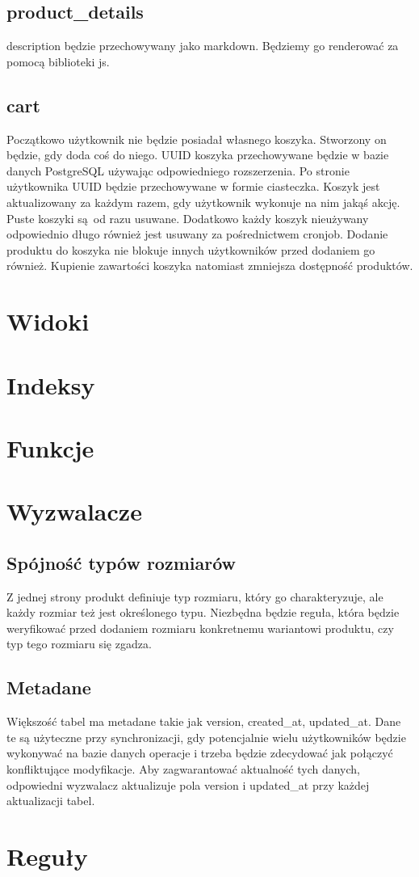 \subsection*{product\_details}
description będzie przechowywany jako markdown. Będziemy go renderować za pomocą biblioteki js.

\subsection*{cart}
Początkowo użytkownik nie będzie posiadał własnego koszyka. Stworzony on będzie, gdy doda coś do niego. UUID koszyka przechowywane będzie w bazie danych PostgreSQL używając odpowiedniego rozszerzenia. Po stronie użytkownika UUID będzie przechowywane w formie ciasteczka. Koszyk jest aktualizowany za każdym razem, gdy użytkownik wykonuje na nim jakąś akcję. Puste koszyki są od razu usuwane. Dodatkowo każdy koszyk nieużywany odpowiednio długo również jest usuwany za pośrednictwem cronjob. Dodanie produktu do koszyka nie blokuje innych użytkowników przed dodaniem go również. Kupienie zawartości koszyka natomiast zmniejsza dostępność produktów.

\section*{Widoki}

\section*{Indeksy}

\section*{Funkcje}

\section*{Wyzwalacze}
\subsection*{Spójność typów rozmiarów}
Z jednej strony produkt definiuje typ rozmiaru, który go charakteryzuje, ale każdy rozmiar też jest określonego typu. Niezbędna będzie reguła, która będzie weryfikować przed dodaniem rozmiaru konkretnemu wariantowi produktu, czy typ tego rozmiaru się zgadza.

\subsection*{Metadane}
Większość tabel ma metadane takie jak version, created\_at, updated\_at. Dane te są użyteczne przy synchronizacji, gdy potencjalnie wielu użytkowników będzie wykonywać na bazie danych operacje i trzeba będzie zdecydować jak połączyć konfliktujące modyfikacje. Aby zagwarantować aktualność tych danych, odpowiedni wyzwalacz aktualizuje pola version i updated\_at przy każdej aktualizacji tabel.

\section*{Reguły}



